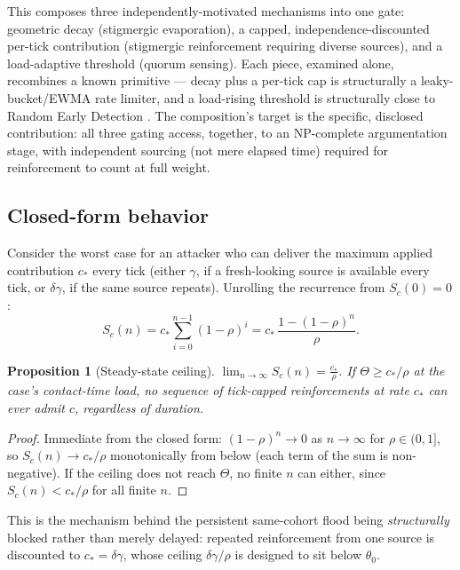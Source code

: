 \documentclass[11pt]{article}
\newtheorem{proposition}{Proposition}
\begin{document}
This composes three independently-motivated mechanisms into one gate: geometric decay
(stigmergic evaporation), a capped, independence-discounted per-tick contribution
(stigmergic reinforcement requiring diverse sources), and a load-adaptive threshold
(quorum sensing). Each piece, examined alone, recombines a known primitive --- decay
plus a per-tick cap is structurally a leaky-bucket/EWMA rate limiter, and a
load-rising threshold is structurally close to Random Early Detection
\cite{floyd1993}. The composition's target is the specific, disclosed contribution: all
three gating access, together, to an NP-complete argumentation stage, with independent
sourcing (not mere elapsed time) required for reinforcement to count at full weight.

\subsection{Closed-form behavior}

Consider the worst case for an attacker who can deliver the maximum applied
contribution $c_{\ast}$ every tick (either $\gamma$, if a fresh-looking source is
available every tick, or $\delta\gamma$, if the same source repeats). Unrolling the
recurrence from $S_c(0) = 0$:
\[
S_c(n) = c_{\ast} \sum_{i=0}^{n-1} (1-\rho)^i = c_{\ast}\,\frac{1-(1-\rho)^n}{\rho}.
\]

\begin{proposition}[Steady-state ceiling]
\label{prop:ceiling}
$\displaystyle \lim_{n\to\infty} S_c(n) = \frac{c_{\ast}}{\rho}$. If
$\Theta \geq c_{\ast}/\rho$ at the case's contact-time load, no sequence of tick-capped
reinforcements at rate $c_{\ast}$ can ever admit $c$, regardless of duration.
\end{proposition}
\begin{proof}
Immediate from the closed form: $(1-\rho)^n \to 0$ as $n\to\infty$ for $\rho \in (0,1]$,
so $S_c(n) \to c_{\ast}/\rho$ monotonically from below (each term of the sum is
non-negative). If the ceiling does not reach $\Theta$, no finite $n$ can either, since
$S_c(n) < c_{\ast}/\rho$ for all finite $n$.
\end{proof}

This is the mechanism behind the persistent same-cohort flood being \emph{structurally}
blocked rather than merely delayed: repeated reinforcement from one source is
discounted to $c_{\ast} = \delta\gamma$, whose ceiling $\delta\gamma/\rho$ is designed to
sit below $\theta_0$.
\end{document}
